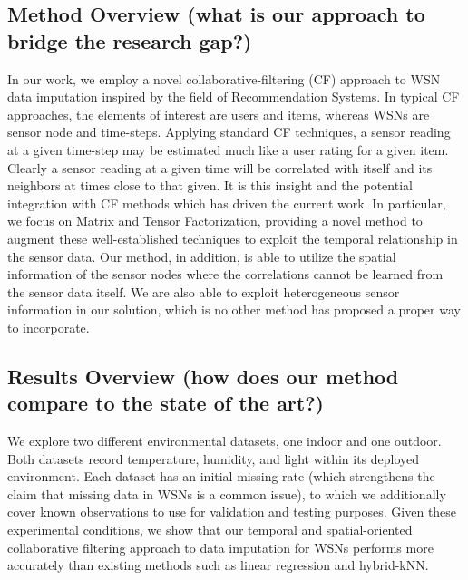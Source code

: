 \subsection{Method Overview (what is our approach to bridge the research gap?)}
In our work, we employ a novel collaborative-filtering (CF) approach to WSN data imputation inspired by the field of Recommendation Systems.
In typical CF approaches, the elements of interest are users and items, whereas WSNs are sensor node and time-steps.
Applying standard CF techniques, a sensor reading at a given time-step may be estimated much like a user rating for a given item.
Clearly a sensor reading at a given time will be correlated with itself and its neighbors at times close to that given.
It is this insight and the potential integration with CF methods which has driven the current work.
In particular, we focus on Matrix and Tensor Factorization, providing a novel method to augment these well-established techniques to exploit the temporal relationship in the sensor data.
Our method, in addition, is able to utilize the spatial information of the sensor nodes where the correlations cannot be learned from the sensor data itself.
We are also able to exploit heterogeneous sensor information in our solution, which is no other method has proposed a proper way to incorporate.

\subsection{Results Overview (how does our method compare to the state of the art?)}
We explore two different environmental datasets, one indoor and one outdoor.
Both datasets record temperature, humidity, and light within its deployed environment.
Each dataset has an initial missing rate (which strengthens the claim that missing data in WSNs is a common issue), to which we additionally cover known observations to use for validation and testing purposes.
Given these experimental conditions, we show that our temporal and spatial-oriented collaborative filtering approach to data imputation for WSNs performs more accurately than existing methods such as linear regression and hybrid-kNN.



